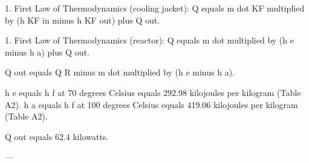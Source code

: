 1. First Law of Thermodynamics (cooling jacket):  
Q equals m dot KF multiplied by (h KF in minus h KF out) plus Q out.  

1. First Law of Thermodynamics (reactor):  
Q equals m dot multiplied by (h e minus h a) plus Q out.  

Q out equals Q R minus m dot multiplied by (h e minus h a).  

h e equals h f at 70 degrees Celsius equals 292.98 kilojoules per kilogram (Table A2).  
h a equals h f at 100 degrees Celsius equals 419.06 kilojoules per kilogram (Table A2).  

Q out equals 62.4 kilowatts.  

---